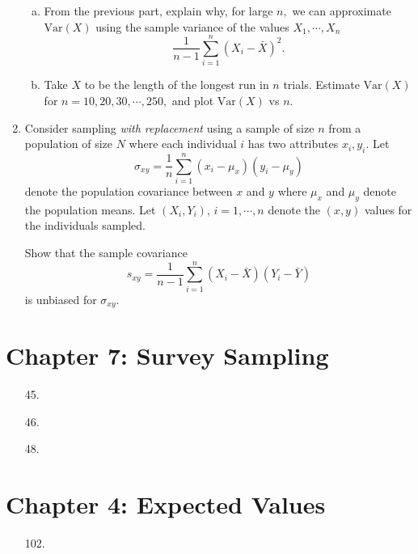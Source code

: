 \documentclass{article}
\newcommand{\var}{\mathrm{Var}}
\begin{document}
\begin{enumerate}
\begin{enumerate}[(a)]
			\item From the previous part, explain why, for large $n,$ we can approximate $\var(X)$ using the sample variance of the values $X_1, \cdots, X_n$ \[\frac{1}{n-1}\sum_{i=1}^n (X_i-\bar{X})^2.\]

			\item Take $X$ to be the length of the longest run in $n$ trials. Estimate $\var(X)$ for $n=10, 20, 30, \cdots, 250,$ and plot $\var(X)$ vs $n.$
				
		\end{enumerate}

	\item Consider sampling \textit{with replacement} using a sample of size $n$ from a population of size $N$ where each individual $i$ has two attributes $x_i, y_i.$ Let \[\sigma_{xy}=\frac{1}{n}\sum_{i=1}^n (x_i-\mu_x)(y_i-\mu_y)\] denote the population covariance between $x$ and $y$ where $\mu_x$ and $\mu_y$ denote the population means. Let $(X_i, Y_i), \, i=1, \cdots, n$ denote the $(x, y)$ values for the individuals sampled. 

		Show that the sample covariance \[s_{xy}=\frac{1}{n-1}\sum_{i=1}^n (X_i-\bar{X})(Y_i-\bar{Y})\] is unbiased for $\sigma_{xy}.$

\end{enumerate}

\section*{Chapter 7: Survey Sampling}
\begin{itemize}
	\item[45.]

	\item[46.]

	\item[48.]

\end{itemize}

\section*{Chapter 4: Expected Values}
\begin{itemize}
	\item[102.]
		
\end{itemize}
\end{document}
